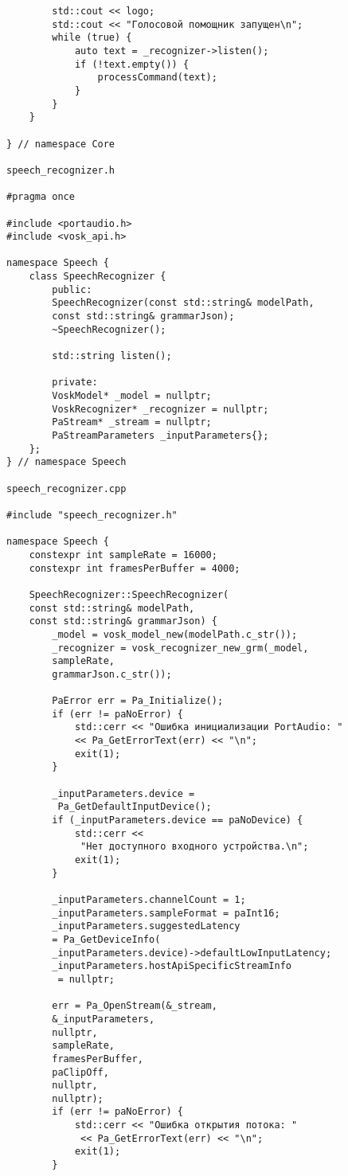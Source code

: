 	\begin{verbatim}
		std::cout << logo;
		std::cout << "Голосовой помощник запущен\n";
		while (true) {
			auto text = _recognizer->listen();
			if (!text.empty()) {
				processCommand(text);
			}
		}
	}
	
} // namespace Core

speech_recognizer.h

#pragma once

#include <portaudio.h>
#include <vosk_api.h>

namespace Speech {
	class SpeechRecognizer {
		public:
		SpeechRecognizer(const std::string& modelPath,
		const std::string& grammarJson);
		~SpeechRecognizer();
		
		std::string listen();
		
		private:
		VoskModel* _model = nullptr;
		VoskRecognizer* _recognizer = nullptr;
		PaStream* _stream = nullptr;
		PaStreamParameters _inputParameters{};
	};
} // namespace Speech

speech_recognizer.cpp

#include "speech_recognizer.h"

namespace Speech {
	constexpr int sampleRate = 16000;
	constexpr int framesPerBuffer = 4000;
	
	SpeechRecognizer::SpeechRecognizer(
	const std::string& modelPath,
	const std::string& grammarJson) {
		_model = vosk_model_new(modelPath.c_str());
		_recognizer = vosk_recognizer_new_grm(_model,
		sampleRate,
		grammarJson.c_str());
		
		PaError err = Pa_Initialize();
		if (err != paNoError) {
			std::cerr << "Ошибка инициализации PortAudio: "
			<< Pa_GetErrorText(err) << "\n";
			exit(1);
		}
		
		_inputParameters.device =
		 Pa_GetDefaultInputDevice();
		if (_inputParameters.device == paNoDevice) {
			std::cerr <<
			 "Нет доступного входного устройства.\n";
			exit(1);
		}
		
		_inputParameters.channelCount = 1;
		_inputParameters.sampleFormat = paInt16;
		_inputParameters.suggestedLatency
		= Pa_GetDeviceInfo(
		_inputParameters.device)->defaultLowInputLatency;
		_inputParameters.hostApiSpecificStreamInfo
		 = nullptr;
		
		err = Pa_OpenStream(&_stream,
		&_inputParameters,
		nullptr,
		sampleRate,
		framesPerBuffer,
		paClipOff,
		nullptr,
		nullptr);
		if (err != paNoError) {
			std::cerr << "Ошибка открытия потока: "
			 << Pa_GetErrorText(err) << "\n";
			exit(1);
		}
		

\end{verbatim}
